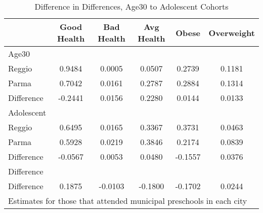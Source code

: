 \begin{table}[htbp]\centering
\caption{Difference in Differences, Age30 to Adolescent Cohorts}
\begin{tabular}{l*{5}{c}}
\hline\hline
            & Good Health&  Bad Health&  Avg Health&       Obese&  Overweight\\
\hline
Age30       &            &            &            &            &            \\
Reggio      &      0.9484&      0.0005&      0.0507&      0.2739&      0.1181\\
Parma       &      0.7042&      0.0161&      0.2787&      0.2884&      0.1314\\
Difference  &     -0.2441&      0.0156&      0.2280&      0.0144&      0.0133\\
\hline
Adolescent  &            &            &            &            &            \\
Reggio      &      0.6495&      0.0165&      0.3367&      0.3731&      0.0463\\
Parma       &      0.5928&      0.0219&      0.3846&      0.2174&      0.0839\\
Difference  &     -0.0567&      0.0053&      0.0480&     -0.1557&      0.0376\\
\hline
Difference  &            &            &            &            &            \\
Difference  &      0.1875&     -0.0103&     -0.1800&     -0.1702&      0.0244\\
\hline\hline
\multicolumn{6}{l}{\footnotesize Estimates for those that attended municipal preschools in each city}\\
\end{tabular}
\end{table}
